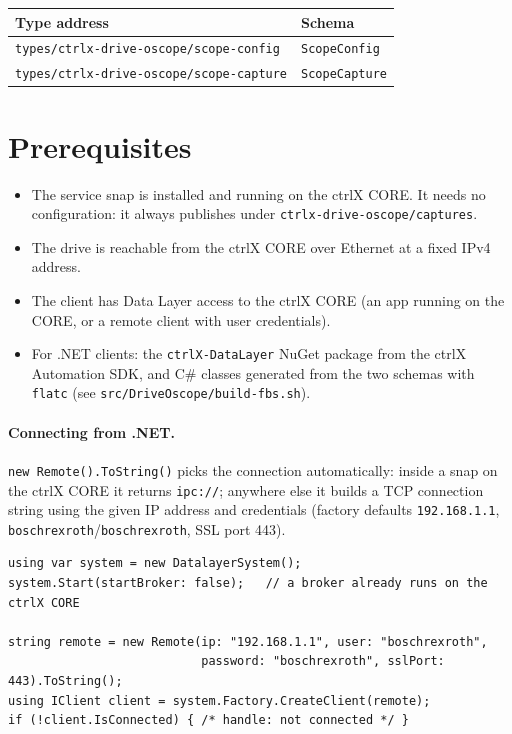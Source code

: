 \documentclass[11pt,a4paper]{article}
\newcommand{\dl}[1]{\texttt{#1}}
\newcommand{\capsroot}{\dl{ctrlx-drive-oscope/captures}}
\begin{document}
\begin{center}
\begin{tabular}{@{}ll@{}}
\toprule
Type address & Schema \\
\midrule
\dl{types/ctrlx-drive-oscope/scope-config}  & \dl{ScopeConfig} \\
\dl{types/ctrlx-drive-oscope/scope-capture} & \dl{ScopeCapture} \\
\bottomrule
\end{tabular}
\end{center}

\section{Prerequisites}

\begin{itemize}
  \item The service snap is installed and running on the ctrlX CORE. It needs
        no configuration: it always publishes under \capsroot.
  \item The drive is reachable from the ctrlX CORE over Ethernet at a fixed
        IPv4 address.
  \item The client has Data Layer access to the ctrlX CORE (an app running on
        the CORE, or a remote client with user credentials).
  \item For .NET clients: the \dl{ctrlX-DataLayer} NuGet package from the
        ctrlX Automation SDK, and C\# classes generated from the two schemas
        with \dl{flatc} (see \dl{src/DriveOscope/build-fbs.sh}).
\end{itemize}

\paragraph{Connecting from .NET.}
\dl{new Remote().ToString()} picks the connection automatically: inside a snap
on the ctrlX CORE it returns \dl{ipc://}; anywhere else it builds a TCP
connection string using the given IP address and credentials (factory defaults
\dl{192.168.1.1}, \dl{boschrexroth}/\dl{boschrexroth}, SSL port 443).

\begin{lstlisting}[language={[Sharp]C}]
using var system = new DatalayerSystem();
system.Start(startBroker: false);   // a broker already runs on the ctrlX CORE

string remote = new Remote(ip: "192.168.1.1", user: "boschrexroth",
                           password: "boschrexroth", sslPort: 443).ToString();
using IClient client = system.Factory.CreateClient(remote);
if (!client.IsConnected) { /* handle: not connected */ }
\end{lstlisting}
\end{document}
